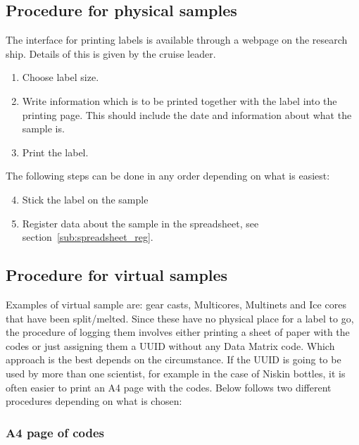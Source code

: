 \documentclass[a4paper,english, 11pt]{article}
\begin{document}
\subsection{Procedure for physical samples} %
\label{sub:Procedure for physical samples}


The interface for printing labels is available through a webpage on the research ship. Details of this is given by the cruise leader.

\begin{enumerate}
    \item Choose label size.
    \item Write information which is to be printed together with the label into the printing page. This should include the date and information about what the sample is.
    \item Print the label.  
\end{enumerate}
The following steps can be done in any order depending on what is easiest:
\begin{enumerate}
\setcounter{enumi}{3}
    \item Stick the label on the sample
    \item Register data about the sample in the spreadsheet, see section~\ref{sub:spreadsheet_reg}.
\end{enumerate}


\subsection{Procedure for virtual samples} %
\label{sub:Procedure for virtual samples}

Examples of virtual sample are: gear casts, Multicores, Multinets and Ice cores that have been split/melted. Since these have no physical place for a label to go, the procedure of logging them involves either printing a sheet of paper with the codes or just assigning them a UUID without any Data Matrix code. Which approach is the best depends on the circumstance. If the UUID is going to be used by more than one scientist, for example in the case of Niskin bottles, it is often easier to print an A4 page with the codes. Below follows two different procedures depending on what is chosen:

\subsubsection{A4 page of codes} %
\label{ssub:A4_page}
\end{document}
